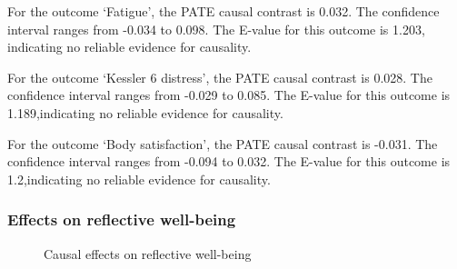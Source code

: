\documentclass[
  singlecolumn,
  9pt]{article}
\begin{document}
For the outcome `Fatigue', the PATE causal contrast is 0.032. The
confidence interval ranges from -0.034 to 0.098. The E-value for this
outcome is 1.203, indicating no reliable evidence for causality.

For the outcome `Kessler 6 distress', the PATE causal contrast is 0.028.
The confidence interval ranges from -0.029 to 0.085. The E-value for
this outcome is 1.189,indicating no reliable evidence for causality.

For the outcome `Body satisfaction', the PATE causal contrast is -0.031.
The confidence interval ranges from -0.094 to 0.032. The E-value for
this outcome is 1.2,indicating no reliable evidence for causality.

\newpage{}

\subsubsection{Effects on reflective
well-being}\label{effects-on-reflective-well-being-1}

\begin{figure}


\caption{\label{fig-results-reflective-well-being-dogs}Causal effects on
reflective well-being}

\end{figure}%

\newpage{}
\end{document}
